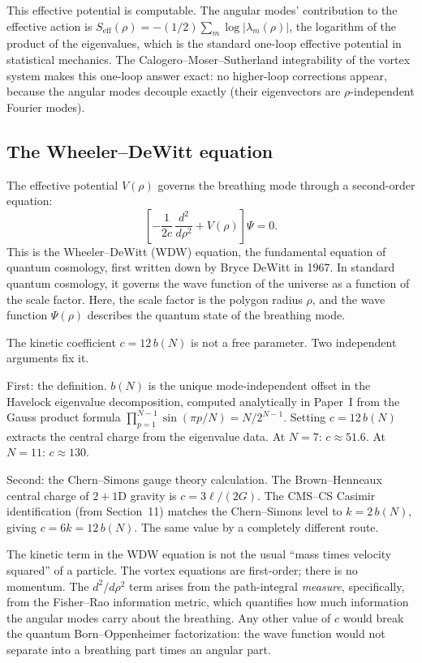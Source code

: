 This effective potential is computable. The angular modes' contribution to
the effective action is
$S_{\text{eff}}(\rho) = -(1/2)\sum_m \log|\lambda_m(\rho)|$, the
logarithm of the product of the eigenvalues, which is the standard
one-loop effective potential in statistical mechanics. The
Calogero--Moser--Sutherland integrability of the vortex system makes this
one-loop answer exact: no higher-loop corrections appear, because the
angular modes decouple exactly (their eigenvectors are $\rho$-independent
Fourier modes).

\subsection*{The Wheeler--DeWitt equation}

The effective potential $V(\rho)$ governs the breathing mode through a
second-order equation:
\[
  \left[-\frac{1}{2c}\,\frac{d^2}{d\rho^2}
  + V(\rho)\right]\Psi = 0.
\]
This is the Wheeler--DeWitt (WDW) equation, the fundamental equation
of quantum cosmology, first written down by Bryce DeWitt in 1967. In
standard quantum cosmology, it governs the wave function of the universe
as a function of the scale factor. Here, the scale factor is the polygon
radius $\rho$, and the wave function $\Psi(\rho)$ describes the quantum
state of the breathing mode.

The kinetic coefficient $c = 12\,b(N)$ is not a free parameter. Two
independent arguments fix it.

First: the definition. $b(N)$ is the unique mode-independent offset in
the Havelock eigenvalue decomposition, computed analytically in Paper~I
from the Gauss product formula
$\prod_{p=1}^{N-1}\sin(\pi p/N) = N/2^{N-1}$. Setting $c = 12\,b(N)$
extracts the central charge from the eigenvalue data. At $N = 7$:
$c \approx 51.6$. At $N = 11$: $c \approx 130$.

Second: the Chern--Simons gauge theory calculation. The Brown--Henneaux
central charge of $2{+}1$D gravity is $c = 3\ell/(2G)$. The CMS--CS
Casimir identification (from Section~11) matches the Chern--Simons level
to $k = 2\,b(N)$, giving $c = 6k = 12\,b(N)$. The same value by a
completely different route.

The kinetic term in the WDW equation is not the usual ``mass times
velocity squared'' of a particle. The vortex equations are first-order;
there is no momentum. The $d^2/d\rho^2$ term arises from the
path-integral \emph{measure}, specifically, from the Fisher--Rao
information metric, which quantifies how much information the angular
modes carry about the breathing. Any other value of $c$ would break the
quantum Born--Oppenheimer factorization: the wave function would not
separate into a breathing part times an angular part.

